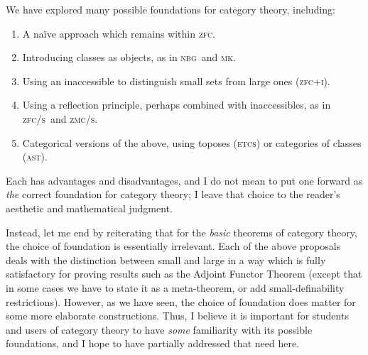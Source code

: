 \documentclass{amsart}
\def\zfc{\textsc{zfc}}
\def\zfci{\textsc{zfc+i}}
\def\zfcs{\textsc{zfc/s}}
\def\zmcs{\textsc{zmc/s}}
\def\nbg{\textsc{nbg}}
\def\mk{\textsc{mk}}
\def\etcs{\textsc{etcs}}
\def\ast{\textsc{ast}}
\begin{document}
We have explored many possible foundations for category theory, including:
\begin{enumerate}[(1)]
\item A na\"ive approach which remains within \zfc.
\item Introducing classes as objects, as in \nbg\ and \mk.
\item Using an inaccessible to distinguish small sets from large ones (\zfci).
\item Using a reflection principle, perhaps combined with
  inaccessibles, as in \zfcs\ and \zmcs.
\item Categorical versions of the above, using toposes (\etcs) or
  categories of classes (\ast).
\end{enumerate}
Each has advantages and disadvantages, and I do not mean to put one
forward as \emph{the} correct foundation for category theory; I leave
that choice to the reader's aesthetic and mathematical judgment.

Instead, let me end by reiterating that for the \emph{basic} theorems
of category theory, the choice of foundation is essentially
irrelevant.  Each of the above proposals deals with the distinction
between small and large in a way which is fully satisfactory for
proving results such as the Adjoint Functor Theorem (except that in
some cases we have to state it as a meta-theorem, or add
small-definability restrictions).  However, as we have seen, the
choice of foundation does matter for some more elaborate
constructions.  Thus, I believe it is important for students and users
of category theory to have \emph{some} familiarity with its possible
foundations, and I hope to have partially addressed that need here.




\end{document}
